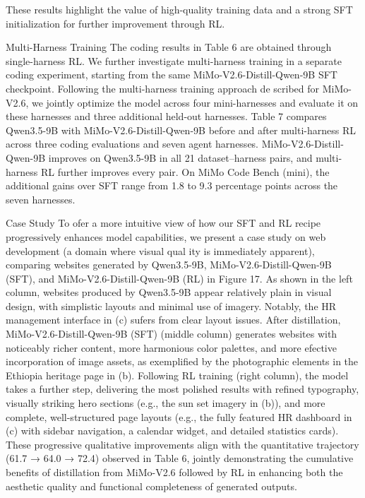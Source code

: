 \documentclass[
  10
]{article}
\begin{document}
These results highlight the value of high-quality training data and a
strong SFT initialization for further improvement through RL.

Multi-Harness Training The coding results in Table 6 are obtained
through single-harness RL. We further investigate multi-harness training
in a separate coding experiment, starting from the same
MiMo-V2.6-Distill-Qwen-9B SFT checkpoint. Following the multi-harness
training approach de scribed for MiMo-V2.6, we jointly optimize the
model across four mini-harnesses and evaluate it on these harnesses and
three additional held-out harnesses. Table 7 compares Qwen3.5-9B with
MiMo-V2.6-Distill-Qwen-9B before and after multi-harness RL across three
coding evaluations and seven agent harnesses. MiMo-V2.6-Distill-Qwen-9B
improves on Qwen3.5-9B in all 21 dataset--harness pairs, and
multi-harness RL further improves every pair. On MiMo Code Bench (mini),
the additional gains over SFT range from 1.8 to 9.3 percentage points
across the seven harnesses.

Case Study To ofer a more intuitive view of how our SFT and RL recipe
progressively enhances model capabilities, we present a case study on
web development (a domain where visual qual ity is immediately
apparent), comparing websites generated by Qwen3.5-9B,
MiMo-V2.6-Distill-Qwen-9B (SFT), and MiMo-V2.6-Distill-Qwen-9B (RL) in
Figure 17. As shown in the left column, websites produced by Qwen3.5-9B
appear relatively plain in visual design, with simplistic layouts and
minimal use of imagery. Notably, the HR management interface in (c)
sufers from clear layout issues. After distillation,
MiMo-V2.6-Distill-Qwen-9B (SFT) (middle column) generates websites with
noticeably richer content, more harmonious color palettes, and more
efective incorporation of image assets, as exemplified by the
photographic elements in the Ethiopia heritage page in (b). Following RL
training (right column), the model takes a further step, delivering the
most polished results with refined typography, visually striking hero
sections (e.g., the sun set imagery in (b)), and more complete,
well-structured page layouts (e.g., the fully featured HR dashboard in
(c) with sidebar navigation, a calendar widget, and detailed statistics
cards). These progressive qualitative improvements align with the
quantitative trajectory (61.7 → 64.0 → 72.4) observed in Table 6,
jointly demonstrating the cumulative benefits of distillation from
MiMo-V2.6 followed by RL in enhancing both the aesthetic quality and
functional completeness of generated outputs.
\end{document}
